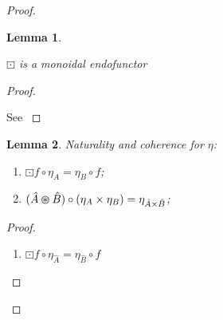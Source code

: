\documentclass[a4paper]{article}
\newtheorem{lemma}{Lemma}
\begin{document}
\begin{proof}
\begin{small}
\begin{prooftree}
\end{prooftree}
\end{small}

\begin{lemma}
  $ $

  $\boxdot$ is a monoidal endofunctor
\end{lemma}

\begin{proof}
$ $

See \cite{ModalK}
\end{proof}

\begin{lemma} Naturality and coherence for $\eta$:

\begin{enumerate}
  \item $\boxdot f \circ \eta_A = \eta_B \circ f$;
  \item $(\hat{A} \varoast \hat{B}) \circ (\eta_{A} \times \eta_{B}) = \eta_{\hat{A} \times \hat{B}}$;
\end{enumerate}
\end{lemma}

\begin{proof}
  $ $

\begin{enumerate}
\item $\boxdot f \circ \eta_{\hat{A}} = \eta_{\hat{B}} \circ f$ \\


\end{enumerate}
\end{proof}
\end{proof}
\end{document}
